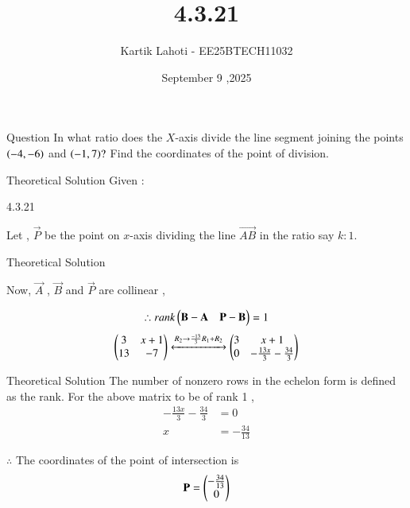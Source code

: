 \documentclass{beamer}
\title %
{4.3.21}
\date{September 9 ,2025}
\author 
{Kartik Lahoti - EE25BTECH11032}
\begin{document}
\frame{\titlepage}
\begin{frame}{Question}
In what ratio does the $X$-axis divide the line segment joining the points $\left(-4,-6\right)$ and $\left(-1,7\right)?$ Find the coordinates of the point of division.
\end{frame}

\begin{frame}{Theoretical Solution}
Given :
\begin{table}[H]
    \centering
    
    \caption{4.3.21}
    \label{tab:placeholder_1}
\end{table}

Let , $\vec{P}$ be the point on $x$-axis dividing the  line $\vec{AB}$ in the ratio say $k\colon1$.
\end{frame}
\begin{frame}{Theoretical Solution}

Now, $\vec{A}$ , $\vec{B}$ and $\vec{P}$ are collinear , 

\begin{align}
    \therefore rank\begin{pmatrix}\mathbf{B} - \mathbf{A} & \mathbf{P} - \mathbf{B}\end{pmatrix} = 1
\end{align}
\begin{align}
    \begin{pmatrix}3 & x+1 \\ 13 & -7 \end{pmatrix} \xleftrightarrow[]{R_2 \rightarrow {\frac{-13}{3}R_1 + R_2}} \begin{pmatrix}3 & x+1 \\ 0 & -\frac{13x}{3}-\frac{34}{3} \end{pmatrix} 
\end{align}

\end{frame}

\begin{frame}{Theoretical Solution}
The number of nonzero rows in the echelon form is defined as the rank. For the above matrix to be of rank 1 ,
\begin{align}
    -\frac{13x}{3}-\frac{34}{3} &= 0  \\ 
    x &= -\frac{34}{13}
\end{align}

$\therefore$ The coordinates of the point of intersection is 
\begin{align}
    \mathbf{P} = \begin{pmatrix}-\frac{34}{13}  \\ 0\end{pmatrix}
\end{align}
\end{frame}
\end{document}
